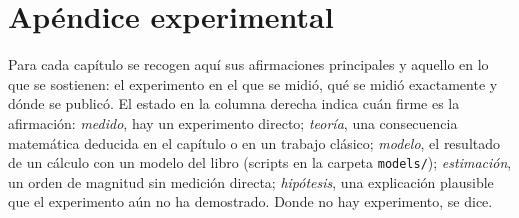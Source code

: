 \chapter{Apéndice experimental}
\label{sec:supplement}

Para cada capítulo se recogen aquí sus afirmaciones principales y aquello en lo que se sostienen: el experimento en el que se midió, qué se midió exactamente y dónde se publicó. El estado en la columna derecha indica cuán firme es la afirmación: \emph{medido}, hay un experimento directo; \emph{teoría}, una consecuencia matemática deducida en el capítulo o en un trabajo clásico; \emph{modelo}, el resultado de un cálculo con un modelo del libro (scripts en la carpeta \texttt{models/}); \emph{estimación}, un orden de magnitud sin medición directa; \emph{hipótesis}, una explicación plausible que el experimento aún no ha demostrado. Donde no hay experimento, se dice.























